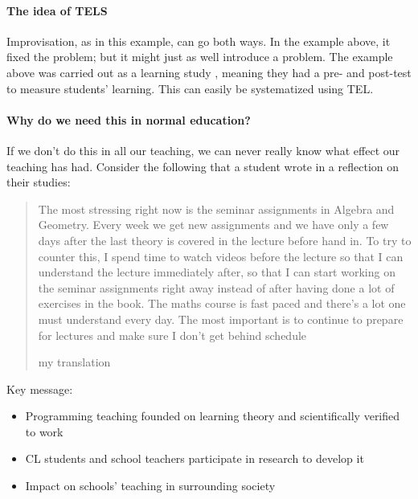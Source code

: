 \paragraph{The idea of \acs*{TELS}}

Improvisation, as in this example, can go both ways.
In the example above, it fixed the problem; but it might just as well introduce 
a problem.
The example above was carried out as a learning study 
\parencite{LearningStudy}, meaning they had a pre- and post-test to measure 
students' learning.
This can easily be systematized using \ac{TEL}.

\paragraph{Why do we need this in normal education?}

If we don't do this in all our teaching, we can never really know what effect 
our teaching has had.
Consider the following that a student wrote in a reflection on their studies:
\blockquote[my translation][.]{%
  The most stressing right now is the seminar assignments in  Algebra and Geometry.
  Every week we get new assignments and we have only a few days after the last 
  theory is covered in the lecture before hand in.
  To try to counter this, I spend time to watch videos before the lecture so 
  that I can understand the lecture immediately after, so that I can start 
  working on the seminar assignments right away instead of after having done a 
  lot of exercises in the book.
  The maths course is fast paced and there's a lot one must understand every 
  day.
  The most important is to continue to prepare for lectures and make sure I 
  don't get behind schedule%
}


Key message:
\begin{itemize}
  \item Programming teaching founded on learning theory and scientifically 
    verified to work

  \item CL students and school teachers participate in research to develop it

  \item Impact on schools' teaching in surrounding society
\end{itemize}

